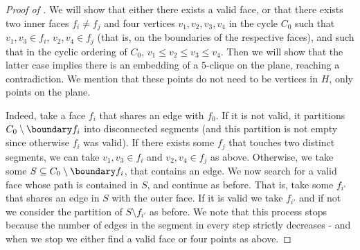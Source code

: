 
%

\begin{proof}[Proof of ]
    We will show that either there exists a valid face, or that there exists two inner faces \(f_i \ne f_j\) and four vertices \(v_1,v_2,v_3,v_4\) in the cycle \(C_0\) such that \(v_1,v_3 \in f_i\), \(v_2,v_4 \in f_j\) (that is, on the boundaries of the respective faces), and such that in the cyclic ordering of \(C_0\), \(v_1 \leq v_2 \leq v_3 \leq v_4\). Then we will show that the latter case implies there is an embedding of a \(5\)-clique on the plane, reaching a contradiction. We mention that these points do not need to be vertices in \(H\), only points on the plane.
    
    Indeed, take a face \(f_i\) that shares an edge with \(f_0\). If it is not valid, it partitions \(C_0 \setminus \boundary f_i\) into disconnected segments (and this partition is not empty since otherwise \(f_i\) was valid). If there exists some \(f_j\) that touches two distinct segments, we can take \(v_1,v_3 \in f_i\) and \(v_2,v_4 \in f_j\) as above. Otherwise, we take some \(S \subseteq C_0 \setminus \boundary f_i\), that contains an edge. We now search for a valid face whose path is contained in \(S\), and continue as before. That is, take some \(f_{i'}\) that shares an edge in \(S\) with the outer face. If it is valid we take \(f_{i'}\) and if not we consider the partition of \(S \setminus f_{i'}\) as before. We note that this process stops because the number of edges in the segment in every step strictly decreases - and when we stop we either find a valid face or four points as above.
    

\end{proof}
